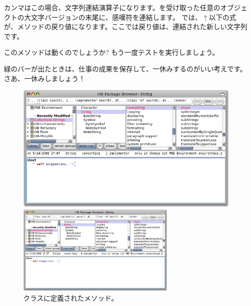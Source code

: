 \documentclass[a4paper,10pt,twoside]{book}
\begin{document}
カンマはこの場合、文字列連結演算子になります。を受け取った任意のオブジェクトの大文字バージョンの末尾に、感嘆符を連結します。
\pharo では、$\uparrow$以下の式が、メソッドの戻り値になります。ここでは戻り値は、連結された新しい文字列です。

このメソッドは動くのでしょうか? もう一度テストを実行しましょう。

緑のバーが出たときは、仕事の成果を保存して、一休みするのがいい考えです。
さあ、一休みしましょう！

\begin{figure}[hbt]
\ifluluelse
	{\centerline{\includegraphics[width=\textwidth]{String-Shout}}}
	{\centerline{\includegraphics[width=0.7\textwidth]{String-Shout}}}
\caption{クラスに定義されたメソッド。
}
\end{figure}

\end{document}
